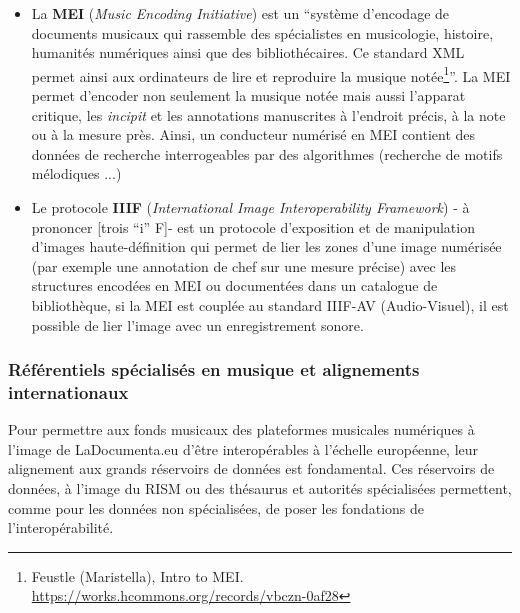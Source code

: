 \begin{itemize}
	\item La\textbf{ MEI }(\textit{Music Encoding Initiative}) est un \enquote{système d'encodage de documents musicaux qui rassemble des spécialistes en musicologie, histoire, humanités numériques ainsi que des bibliothécaires. Ce standard XML permet ainsi aux ordinateurs de lire et reproduire la musique notée\footnote{Feustle (Maristella), Intro to MEI. \url{https://works.hcommons.org/records/vbczn-0af28}}}. La MEI permet d'encoder non seulement la musique notée mais aussi l'apparat critique, les \textit{incipit} et les annotations manuscrites à l'endroit précis, à la note ou à la mesure près. Ainsi, un conducteur numérisé en MEI contient des données de recherche interrogeables par des algorithmes (recherche de motifs mélodiques ...)
	
	\item Le protocole \textbf{IIIF} (\textit{International Image Interoperability Framework}) - à prononcer [trois \enquote{i} F]- est un protocole d'exposition et de manipulation d'images haute-définition qui permet de lier les zones d'une image numérisée (par exemple une annotation de chef sur une mesure précise) avec les structures encodées en MEI ou documentées dans un catalogue de bibliothèque, si la MEI est couplée au standard IIIF-AV (Audio-Visuel), il est possible de lier l'image avec un enregistrement sonore.  
\end{itemize}

\subsubsection*{Référentiels spécialisés en musique et alignements internationaux}

Pour permettre aux fonds musicaux des plateformes musicales numériques à l'image de LaDocumenta.eu d'être interopérables à l'échelle européenne, leur alignement aux grands réservoirs de données est fondamental. 
Ces réservoirs de données, à l'image du RISM ou des thésaurus et autorités spécialisées permettent, comme pour les données non spécialisées, de poser les fondations de l'interopérabilité. 

